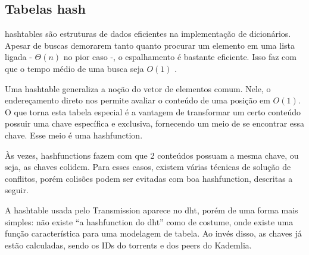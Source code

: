 
\subsection*{Tabelas hash}

\Glspl{hashtable} são estruturas de dados eficientes na implementação de dicionários.
Apesar de buscas demorarem tanto quanto procurar um elemento em uma lista ligada -
$\Theta(n)$ no pior caso -, o espalhamento é bastante eficiente. Isso faz com que o
tempo médio de uma busca seja $O(1)$ \cite{book:clrs}.

Uma \gls*{hashtable} generaliza a noção do vetor de elementos comum. Nele, o
endereçamento direto nos permite avaliar o conteúdo de uma posição em $O(1)$. O que
torna esta tabela especial é a vantagem de transformar um certo conteúdo possuir uma
chave específica e exclusiva, fornecendo um meio de se encontrar essa chave. Esse meio é
uma \gls{hashfunction}.

Às vezes, \glspl*{hashfunction} fazem com que 2 conteúdos possuam a mesma chave, ou
seja, as chaves colidem. Para esses casos, existem várias técnicas de solução de
conflitos, porém colisões podem ser evitadas com boa \gls*{hashfunction}, descritas a
seguir.

A \gls*{hashtable} usada pelo Transmission aparece no \gls*{dht}, porém de uma forma
mais simples: não existe ``a \gls*{hashfunction} do \gls*{dht}'' como de costume, onde
existe uma função característica para uma modelagem de tabela. Ao invés disso, as chaves
já estão calculadas, sendo os IDs do \glspl*{torrent} e dos \glspl*{peer} do Kademlia.